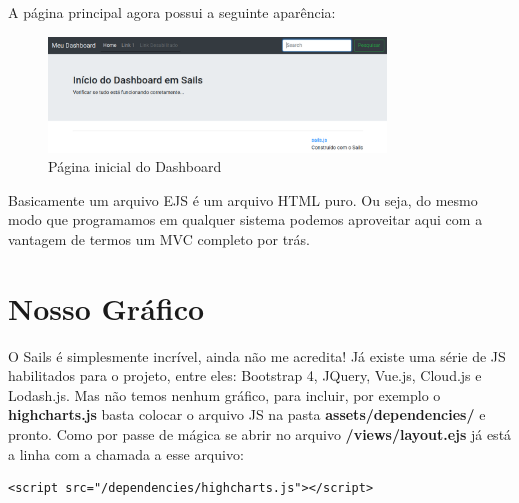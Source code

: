\documentclass[a4paper,11pt]{article}
\begin{document}
A página principal agora possui a seguinte aparência:
\begin{figure}[H]
	\centering
	\includegraphics[width=0.8\textwidth]{imagens/corpoDashboard.png}
	\caption{Página inicial do Dashboard}
\end{figure}

Basicamente um arquivo EJS é um arquivo HTML puro. Ou seja, do mesmo modo que programamos em qualquer sistema podemos aproveitar aqui com a vantagem de termos um MVC completo por trás.

\section{Nosso Gráfico}
O Sails é simplesmente incrível, ainda não me acredita! Já existe uma série de JS habilitados para o projeto, entre eles: Bootstrap 4, JQuery, Vue.js, Cloud.js e Lodash.js. Mas não temos nenhum gráfico, para incluir, por exemplo o \textbf{highcharts.js} \cite{highcharts} basta colocar o arquivo JS na pasta \textbf{assets/dependencies/} e pronto. Como por passe de mágica se abrir no arquivo \textbf{/views/layout.ejs} já está a linha com a chamada a esse arquivo:
\begin{lstlisting}
<script src="/dependencies/highcharts.js"></script>
\end{lstlisting}
\end{document}
